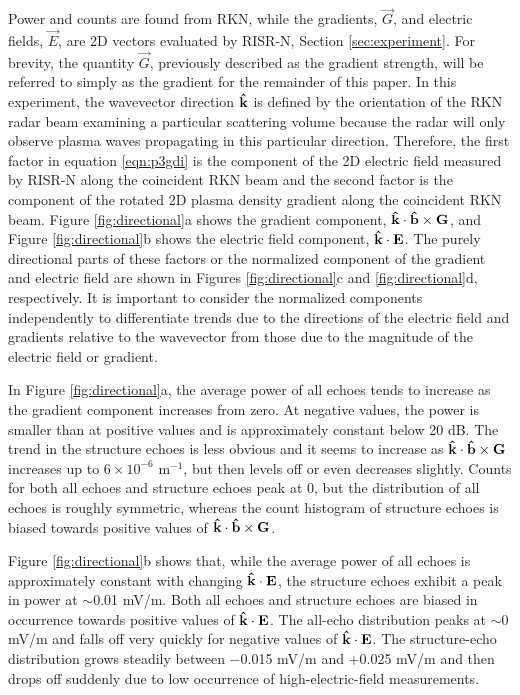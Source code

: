 Power and counts are found from RKN, while the gradients, \(\vec{G}\), and electric fields, \(\vec{E}\), are 2D vectors evaluated by RISR-N, Section \ref{sec:experiment}. For brevity, the quantity \(\vec{G}\), previously described as the gradient strength, will be referred to simply as the gradient for the remainder of this paper.  In this experiment, the wavevector direction \(\mathbf{\hat{k}}\) is defined by the orientation of the RKN radar beam examining a particular scattering volume because the radar will only observe plasma waves propagating in this particular direction. Therefore, the first factor in equation \ref{eqn:p3gdi} is the component of the 2D electric field measured by RISR-N along the coincident RKN beam and the second factor is the component of the rotated 2D plasma density gradient along the coincident RKN beam.  Figure \ref{fig:directional}a shows the gradient component, \(\mathbf{\hat{k}}\cdot\mathbf{\hat{b}}\times\mathbf{G}\), and Figure \ref{fig:directional}b shows the electric field component, \(\mathbf{\hat{k}}\cdot\mathbf{E}\).  The purely directional parts of these factors or the normalized component of the gradient and electric field are shown in Figures \ref{fig:directional}c and \ref{fig:directional}d, respectively.  It is important to consider the normalized components independently to differentiate trends due to the directions of the electric field and gradients relative to the wavevector from those due to the magnitude of the electric field or gradient.

In Figure \ref{fig:directional}a, the average power of all echoes tends to increase as the gradient component increases from zero. At negative values, the power is smaller than at positive values and is approximately constant below 20 dB. The trend in the structure echoes is less obvious and it seems to increase as  \(\mathbf{\hat{k}}\cdot\mathbf{\hat{b}}\times\mathbf{G}\) increases up to \(6\times10^{-6}\) m\(^{-1}\), but then levels off or even decreases slightly.  Counts for both all echoes and structure echoes peak at 0, but the distribution of all echoes is roughly symmetric, whereas the count histogram of structure echoes is biased towards positive values of  \(\mathbf{\hat{k}}\cdot\mathbf{\hat{b}}\times\mathbf{G}\).

Figure \ref{fig:directional}b shows that, while the average power of all echoes is approximately constant with changing \(\mathbf{\hat{k}}\cdot\mathbf{E}\), the structure echoes exhibit a peak in power at \(\sim\)0.01 mV/m.
Both all echoes and structure echoes are biased in occurrence towards positive values of \(\mathbf{\hat{k}}\cdot\mathbf{E}\). The all-echo distribution peaks at \(\sim\)0 mV/m and falls off very quickly for negative values of \(\mathbf{\hat{k}}\cdot\mathbf{E}\). The structure-echo distribution grows steadily between $-$0.015 mV/m and $+$0.025 mV/m and then drops off suddenly due to low occurrence of high-electric-field measurements.

